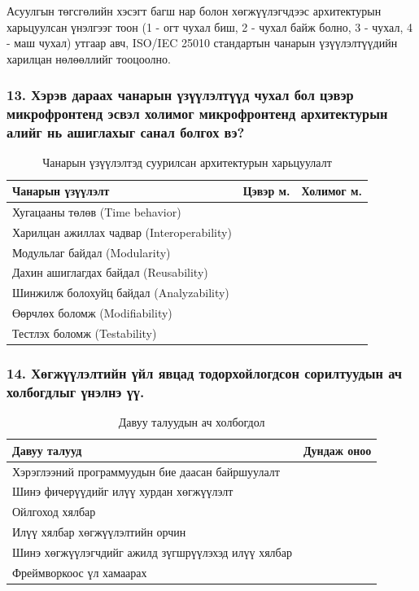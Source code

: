 Асуулгын төгсгөлийн хэсэгт багш нар болон хөгжүүлэгчдээс архитектурын харьцуулсан үнэлгээг тоон (1 - огт чухал биш, 2 - чухал байж болно, 3 - чухал, 4 - маш чухал) утгаар авч, ISO/IEC 25010 стандартын чанарын үзүүлэлтүүдийн харилцан нөлөөллийг тооцоолно. 

\subsubsection{13. Хэрэв дараах чанарын үзүүлэлтүүд чухал бол цэвэр микрофронтенд эсвэл холимог микрофронтенд архитектурын алийг нь ашиглахыг санал болгох вэ?}

\begin{table}[h!]
\centering
\renewcommand{\arraystretch}{0.7}
\begin{tabular}{lcc}
\toprule
\textbf{Чанарын үзүүлэлт} & \textbf{Цэвэр м.} & \textbf{Холимог м.} \\ 
\midrule
Хугацааны төлөв (Time behavior) & & \\ 
Харилцан ажиллах чадвар (Interoperability) & & \\ 
Модульлаг байдал (Modularity) & & \\ 
Дахин ашиглагдах байдал (Reusability) & & \\ 
Шинжилж болохуйц байдал (Analyzability) & & \\ 
Өөрчлөх боломж (Modifiability) & & \\ 
Тестлэх боломж (Testability) & & \\ 
\bottomrule
\end{tabular}
\caption{Чанарын үзүүлэлтэд суурилсан архитектурын харьцуулалт}
\label{tab:qa_comparison}
\end{table}

\subsubsection{14. Хөгжүүлэлтийн үйл явцад тодорхойлогдсон сорилтуудын ач холбогдлыг үнэлнэ үү.}
\begin{table}[h!]
\centering
\renewcommand{\arraystretch}{0.7}
\begin{tabular}{l c}
\toprule
\textbf{Давуу талууд} & \textbf{Дундаж оноо} \\ 
\midrule
Хэрэглээний программуудын бие даасан байршуулалт & \\ 
Шинэ фичерүүдийг илүү хурдан хөгжүүлэлт & \\ 
Ойлгоход хялбар & \\ 
Илүү хялбар хөгжүүлэлтийн орчин & \\ 
Шинэ хөгжүүлэгчдийг ажилд зүгшрүүлэхэд илүү хялбар & \\ 
Фреймворкоос үл хамаарах  & \\ 
\bottomrule
\end{tabular}
\caption{Давуу талуудын ач холбогдол}
\label{tab:benefits_importance}
\end{table}

